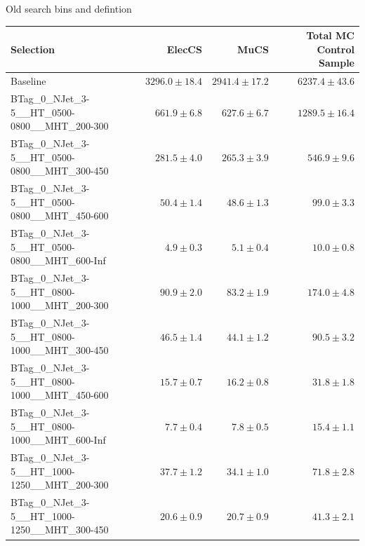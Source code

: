 \documentclass{beamer}
\begin{document}
\begin{frame}
  \begin{center}
    {\Large Old search bins and  \HT \NJets defintion}
  \end{center}
\end{frame}
\begin{frame}
\tiny
\begin{tabular}{lrrr}
\toprule

                                                Selection  &                   ElecCS  &                     MuCS  &          Total MC Control Sample  \\
\midrule
                                             Baseline &           $3296.0\pm18.4$&           $2941.4\pm17.2$&               $6237.4\pm43.6$ \\
      BTag\_0\_NJet\_3-5\_\_HT\_0500-0800\_\_MHT\_200-300 &             $661.9\pm6.8$&             $627.6\pm6.7$&               $1289.5\pm16.4$ \\
      BTag\_0\_NJet\_3-5\_\_HT\_0500-0800\_\_MHT\_300-450 &             $281.5\pm4.0$&             $265.3\pm3.9$&                 $546.9\pm9.6$ \\
      BTag\_0\_NJet\_3-5\_\_HT\_0500-0800\_\_MHT\_450-600 &              $50.4\pm1.4$&              $48.6\pm1.3$&                  $99.0\pm3.3$ \\
      BTag\_0\_NJet\_3-5\_\_HT\_0500-0800\_\_MHT\_600-Inf &               $4.9\pm0.3$&               $5.1\pm0.4$&                  $10.0\pm0.8$ \\
      BTag\_0\_NJet\_3-5\_\_HT\_0800-1000\_\_MHT\_200-300 &              $90.9\pm2.0$&              $83.2\pm1.9$&                 $174.0\pm4.8$ \\
      BTag\_0\_NJet\_3-5\_\_HT\_0800-1000\_\_MHT\_300-450 &              $46.5\pm1.4$&              $44.1\pm1.2$&                  $90.5\pm3.2$ \\
      BTag\_0\_NJet\_3-5\_\_HT\_0800-1000\_\_MHT\_450-600 &              $15.7\pm0.7$&              $16.2\pm0.8$&                  $31.8\pm1.8$ \\
      BTag\_0\_NJet\_3-5\_\_HT\_0800-1000\_\_MHT\_600-Inf &               $7.7\pm0.4$&               $7.8\pm0.5$&                  $15.4\pm1.1$ \\
      BTag\_0\_NJet\_3-5\_\_HT\_1000-1250\_\_MHT\_200-300 &              $37.7\pm1.2$&              $34.1\pm1.0$&                  $71.8\pm2.8$ \\
      BTag\_0\_NJet\_3-5\_\_HT\_1000-1250\_\_MHT\_300-450 &              $20.6\pm0.9$&              $20.7\pm0.9$&                  $41.3\pm2.1$ \\

\end{tabular}
\end{frame}
\end{document}
